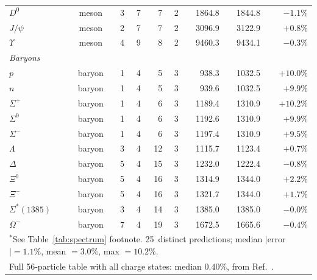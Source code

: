 \documentclass[11pt]{article}
\begin{document}
\begin{table}[h!]
\begin{tabular}{lcrrrrrrr}
$D^0$          & meson  & 3 & 7 &  7 & 2 &  1864.8 &  1844.8 & $-1.1\%$ \\
$J/\psi$       & meson  & 2 & 7 &  7 & 2 &  3096.9 &  3122.9 & $+0.8\%$ \\
$\Upsilon$     & meson  & 4 & 9 &  8 & 2 &  9460.3 &  9434.1 & $-0.3\%$ \\
\midrule
\multicolumn{9}{l}{\textit{Baryons}} \\
$p$            & baryon & 1 & 4 &  5 & 3 &   938.3 &  1032.5 & $+10.0\%$ \\
$n$            & baryon & 1 & 4 &  5 & 3 &   939.6 &  1032.5 & $+9.9\%$ \\
$\Sigma^+$     & baryon & 1 & 4 &  6 & 3 &  1189.4 &  1310.9 & $+10.2\%$ \\
$\Sigma^0$     & baryon & 1 & 4 &  6 & 3 &  1192.6 &  1310.9 & $+9.9\%$ \\
$\Sigma^-$     & baryon & 1 & 4 &  6 & 3 &  1197.4 &  1310.9 & $+9.5\%$ \\
$\Lambda$      & baryon & 3 & 4 & 12 & 3 &  1115.7 &  1123.4 & $+0.7\%$ \\
$\Delta$       & baryon & 5 & 4 & 15 & 3 &  1232.0 &  1222.4 & $-0.8\%$ \\
$\Xi^0$        & baryon & 5 & 4 & 16 & 3 &  1314.9 &  1344.0 & $+2.2\%$ \\
$\Xi^-$        & baryon & 5 & 4 & 16 & 3 &  1321.7 &  1344.0 & $+1.7\%$ \\
$\Sigma^*(1385)$ & baryon & 3 & 4 & 14 & 3 & 1385.0 & 1385.0 & $-0.0\%$ \\
$\Omega^-$     & baryon & 7 & 4 & 19 & 3 &  1672.5 &  1665.6 & $-0.4\%$ \\
\midrule
\multicolumn{9}{l}{\small $^*$See Table~\ref{tab:spectrum} footnote.
    25~distinct predictions; median $|$error$| = 1.1\%$, mean $= 3.0\%$, max $= 10.2\%$.} \\
\multicolumn{9}{l}{\small Full 56-particle table with all charge states:
    median $0.40\%$, from Ref.~\cite{NWT6}.} \\
\bottomrule
\end{tabular}
\end{table}
\end{document}
